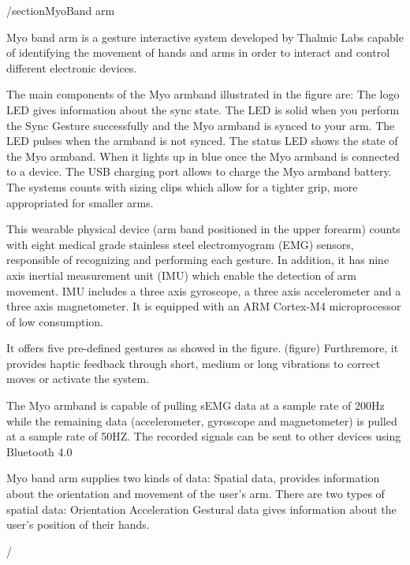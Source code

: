 /section{MyoBand arm}

Myo band arm is a gesture interactive system developed by Thalmic Labs capable of identifying the movement of hands and arms in order to interact and control different electronic devices.


The main components of the Myo armband illustrated in the figure %
are:
The logo LED gives information about the sync state. The LED is solid when you perform the Sync Gesture successfully and
the Myo armband is synced to your arm. The LED pulses when the armband is not synced.
The status LED shows the state of the Myo armband. When it lights up in blue once the Myo armband is connected to a device. 
The USB charging port allows to charge the Myo armband battery. 
The systems counts with sizing clips which allow for a tighter grip, more appropriated for smaller arms.

This wearable physical device (arm band positioned in the upper forearm) counts with eight medical grade stainless steel electromyogram (EMG) sensors, responsible of recognizing and performing each gesture. In addition, it has nine axis inertial measurement unit (IMU) which enable the detection of arm movement. IMU includes a three axis gyroscope,  a three axis accelerometer and a three axis magnetometer. It is equipped with an ARM Cortex-M4 microprocessor of low consumption.

It offers five pre-defined gestures as showed in the figure. (figure) Furthremore, it provides haptic feedback through short, medium or long vibrations to correct moves or activate the system.

The Myo armband is capable of pulling sEMG data at a sample rate of 200Hz while the remaining data (accelerometer, gyroscope and magnetometer) is pulled at a sample rate of  50HZ. The recorded signals can be sent to other devices using Bluetooth 4.0 

Myo band arm supplies two kinds of data:
Spatial data, provides information about the orientation and movement of the user's arm. There are two types of spatial data:
Orientation
Acceleration
Gestural data gives information about the user's position of their hands.









/